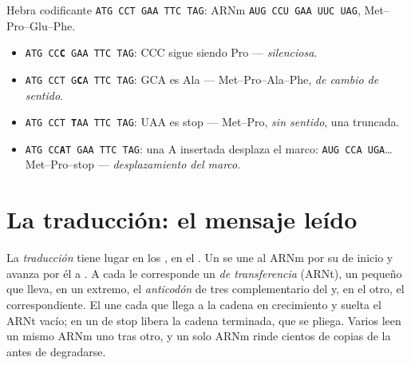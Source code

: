 \begin{example}\label{ex:g11:gene-expression:outcomes}
Hebra codificante \texttt{ATG CCT GAA TTC TAG}: ARNm
\texttt{AUG CCU GAA UUC UAG},  Met--Pro--Glu--Phe.
\begin{itemize}
  \item \texttt{ATG CC\textbf{C} GAA TTC TAG}: CCC sigue siendo Pro ---
        \emph{silenciosa}.
  \item \texttt{ATG CCT G\textbf{C}A TTC TAG}: GCA es Ala ---
        Met--Pro--Ala--Phe, \emph{de cambio de sentido}.
  \item \texttt{ATG CCT \textbf{T}AA TTC TAG}: UAA es stop ---
        Met--Pro, \emph{sin sentido}, una  truncada.
  \item \texttt{ATG CC\textbf{A}T GAA TTC TAG}: una A insertada
        desplaza el marco: \texttt{AUG CCA UGA}\dots{} Met--Pro--stop
        --- \emph{desplazamiento del marco}.
\end{itemize}
\end{example}

\section{La traducción: el mensaje leído}

\begin{proposition}[La traducción]\label{prop:g11:gene-expression:translation}
La \emph{traducción} tiene lugar en los
\emph{}, en el . Un  se une al ARNm por su
 de inicio y avanza por él  a . A cada  le
corresponde un \emph{ de transferencia} (ARNt), un  pequeño que
lleva, en un extremo, el \emph{anticodón} de tres 
complementario del  y, en el otro, el  correspondiente.
El  une cada  que llega a la cadena en crecimiento y
suelta el ARNt vacío; en un  de stop libera la cadena terminada,
que se pliega. Varios  leen un mismo ARNm uno tras otro, y un
solo ARNm rinde cientos de copias de la  antes de degradarse.
\end{proposition}
\admitted

